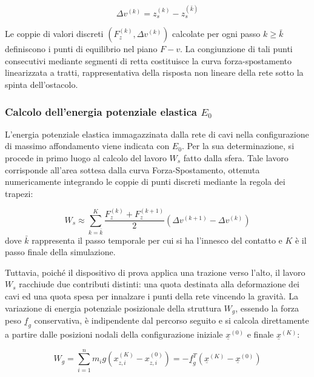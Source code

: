 \begin{equation}
  \Delta v^{(k)} = z_s^{(k)} - z_s^{(\bar{k})} 
\end{equation}

Le coppie di valori discreti $(F_z^{(k)}, \Delta v^{(k)})$ calcolate per ogni passo $k \ge \bar{k}$ definiscono i punti di equilibrio nel piano $F-v$. La congiunzione di tali punti consecutivi mediante segmenti di retta costituisce la curva forza-spostamento linearizzata a tratti, rappresentativa della risposta non lineare della rete sotto la spinta dell'ostacolo.

\subsubsection{Calcolo dell'energia potenziale elastica $E_0$}
L'energia potenziale elastica immagazzinata dalla rete di cavi nella configurazione di massimo affondamento viene indicata con $E_0$. Per la sua determinazione, si procede in primo luogo al calcolo del lavoro $W_s$ fatto dalla sfera. Tale lavoro corrisponde all'area sottesa dalla curva Forza-Spostamento, ottenuta numericamente integrando le coppie di punti discreti mediante la regola dei trapezi:

\begin{equation}
  W_s \approx \sum_{k = \bar{k}}^{K} \frac{F_z^{(k)} + F_z^{(k+1)}}{2} \left( \Delta v^{(k+1)} - \Delta v^{(k)} \right)
\end{equation}
dove $\bar{k}$ rappresenta il passo temporale per cui si ha l'innesco del contatto e $K$ è il passo finale della simulazione.

Tuttavia, poiché il dispositivo di prova applica una trazione verso l'alto, il lavoro $W_s$ racchiude due contributi distinti: una quota destinata alla deformazione dei cavi ed una quota spesa per innalzare i punti della rete vincendo la gravità. La variazione di energia potenziale posizionale della struttura $W_g$, essendo la forza peso $\underline{f}_g$ conservativa, è indipendente dal percorso seguito e si calcola direttamente a partire dalle posizioni nodali della configurazione iniziale $\underline{x}^{(0)}$ e finale $\underline{x}^{(K)}$:

\begin{equation}
   W_g = \sum_{i=1}^{n} m_i g \left( x_{z,i}^{(K)} - x_{z,i}^{(0)} \right) = -\underline{f}_g^T \left( \underline{x}^{(K)} - \underline{x}^{(0)} \right)
\label{eq:energia_posizionale}
\end{equation}

